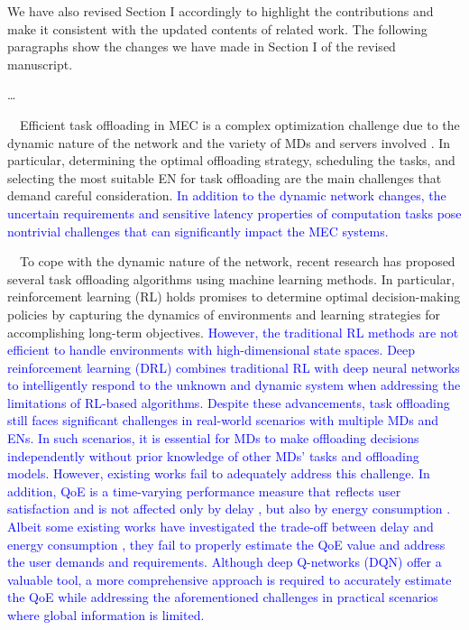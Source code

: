 \documentclass[12pt,draftclsnofoot,onecolumn]{IEEEtran}
\newcommand{\rev}[1]{{\color{blue}#1}} %
\newcommand{\rev}[1]{#1}
\newenvironment{my}[2]%
{\begin{list}{}%
{\setlength{\rightmargin}{#1}\setlength{\leftmargin}{#2}}%


 \item[]{}

} {\end{list}}
\begin{document}
\begin{enumerate}
\vspace{6mm}

We have also revised Section I accordingly to highlight the contributions and make it consistent with the updated contents of related work. The following paragraphs show the changes we have made in Section I of the revised manuscript.

\begin{my}{1cm}{1cm}
	\rev{
		
		
		\color{black}
		

		\dots 
		
		
		\,\,\,\,
		Efficient task offloading in MEC is a complex optimization challenge due to the dynamic nature of the network and the variety of MDs and servers involved \cite{jiang2019toward} \cite{TNSE-WU-24}. In particular, determining the optimal offloading strategy, scheduling the tasks, and selecting the most suitable EN for task offloading are the main challenges that demand careful consideration. \textcolor{blue}{In addition to the dynamic network changes, the uncertain requirements and sensitive latency properties of computation tasks pose nontrivial challenges that can significantly impact the MEC systems.}\vspace{3mm}
		
		
		\,\,\,\,
		To cope with the dynamic nature of the network, recent research has proposed several task offloading algorithms using machine learning methods. In particular, reinforcement learning (RL) \cite{mnih2015human} holds promises to determine optimal decision-making policies by capturing the dynamics of environments and learning strategies for accomplishing long-term objectives. \textcolor{blue}{However, the traditional RL methods are not efficient to  handle  environments with high-dimensional state  spaces. Deep reinforcement learning (DRL) combines  traditional RL  with  deep  neural  networks  to  intelligently respond to the unknown and dynamic system when addressing the limitations of RL-based algorithms. Despite these advancements, task offloading still faces significant challenges in real-world scenarios with multiple MDs and ENs. In such scenarios, it is essential for MDs to make offloading decisions independently  without prior knowledge of other MDs’ tasks and offloading models. However,  existing works fail to adequately address this challenge. In addition, QoE is a time-varying performance measure that reflects user satisfaction and is not affected only by delay \cite{guo2022energy}, but also by energy consumption \cite{tang2022uav}. Albeit some existing works have investigated the trade-off between delay and energy consumption \cite{li2022joint}, they fail to properly estimate the QoE value and address the user demands and requirements. Although deep Q-networks (DQN) offer a valuable tool, a more comprehensive approach is required to accurately estimate the QoE while addressing the aforementioned challenges in practical scenarios where global information is limited.}\vspace{3mm}
		
}
\end{my}
\end{enumerate}
\end{document}
